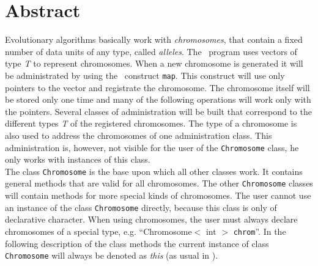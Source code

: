 \section{Abstract}

Evolutionary algorithms basically work with {\em chromosomes},
that contain a fixed number of data units of any type, called {\em alleles}.
The \cpp\ program uses vectors of type {\em T} to represent chromosomes. 
When a new chromosome is generated it will be administrated by using 
the \cpp\ construct {\tt map}. This construct will use only pointers
to the vector and registrate the chromosome.
The chromosome itself will be stored only one time and many of the
following operations will work only with the pointers. 
Several classes of administration will be built that correspond to
the different types {\em T} of the registered chromosomes.
The type of a chromosome is also used to address the chromosomes of one
administration class. This administration is, however, not visible for
the user of the {\tt Chromosome} class, he only works with instances of
this class.\\
The class {\tt Chromosome} is the base upon which all other classes
work. It contains general methods that are valid for all chromosomes.
The other {\tt Chromosome} classes will contain methods for more special
kinds of chromosomes.
The user cannot use an instance of the class {\tt Chromosome} directly,
because this class is only of declarative character. When using chromosomes,
the user must always declare chromosomes of a special type,
e.g. ``Chromosome$<$ int $>$ {\tt chrom}''.
In the following description of the class methods the current instance
of class {\tt Chromosome}
will always be denoted as {\em this} (as usual in \cpp).
